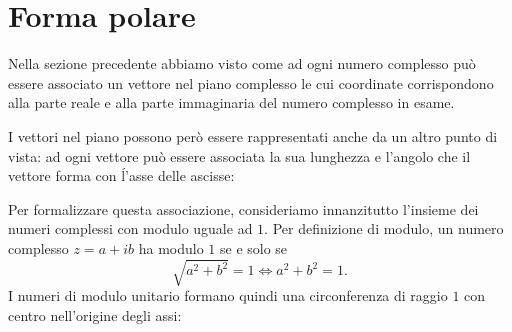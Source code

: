 \section{Forma polare}

Nella sezione precedente abbiamo visto come ad ogni numero complesso può essere associato un vettore nel piano complesso le cui coordinate corrispondono alla parte reale e alla parte immaginaria del numero complesso in esame.

I vettori nel piano possono però essere rappresentati anche da un altro punto di vista: ad ogni vettore può essere associata la sua lunghezza e l'angolo che il vettore forma con ĺ'asse delle ascisse: 
\begin{center}
\end{center}

Per formalizzare questa associazione, consideriamo innanzitutto l'insieme dei numeri complessi con modulo uguale ad $1$. Per definizione di modulo, un numero complesso $z = a+ib$ ha modulo $1$ se e solo se \[
    \sqrt{a^2 + b^2} = 1 \iff a^2 + b^2 = 1.
\] I numeri di modulo unitario formano quindi una circonferenza di raggio $1$ con centro nell'origine degli assi:
\begin{center}
\end{center}

